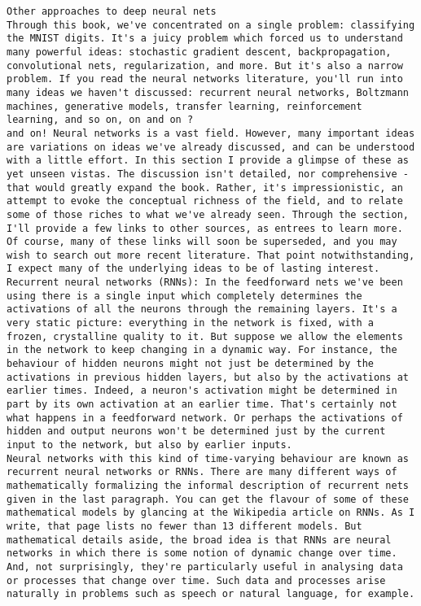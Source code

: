 \begin{lstlisting}
Other approaches to deep neural nets
Through this book, we've concentrated on a single problem: classifying the MNIST digits. It's a juicy problem which forced us to understand many powerful ideas: stochastic gradient descent, backpropagation, convolutional nets, regularization, and more. But it's also a narrow problem. If you read the neural networks literature, you'll run into many ideas we haven't discussed: recurrent neural networks, Boltzmann machines, generative models, transfer learning, reinforcement learning, and so on, on and on ?
and on! Neural networks is a vast field. However, many important ideas are variations on ideas we've already discussed, and can be understood with a little effort. In this section I provide a glimpse of these as yet unseen vistas. The discussion isn't detailed, nor comprehensive - that would greatly expand the book. Rather, it's impressionistic, an attempt to evoke the conceptual richness of the field, and to relate some of those riches to what we've already seen. Through the section, I'll provide a few links to other sources, as entrees to learn more. Of course, many of these links will soon be superseded, and you may wish to search out more recent literature. That point notwithstanding, I expect many of the underlying ideas to be of lasting interest.
Recurrent neural networks (RNNs): In the feedforward nets we've been using there is a single input which completely determines the activations of all the neurons through the remaining layers. It's a very static picture: everything in the network is fixed, with a frozen, crystalline quality to it. But suppose we allow the elements in the network to keep changing in a dynamic way. For instance, the behaviour of hidden neurons might not just be determined by the activations in previous hidden layers, but also by the activations at earlier times. Indeed, a neuron's activation might be determined in part by its own activation at an earlier time. That's certainly not what happens in a feedforward network. Or perhaps the activations of hidden and output neurons won't be determined just by the current input to the network, but also by earlier inputs.
Neural networks with this kind of time-varying behaviour are known as recurrent neural networks or RNNs. There are many different ways of mathematically formalizing the informal description of recurrent nets given in the last paragraph. You can get the flavour of some of these mathematical models by glancing at the Wikipedia article on RNNs. As I write, that page lists no fewer than 13 different models. But mathematical details aside, the broad idea is that RNNs are neural networks in which there is some notion of dynamic change over time. And, not surprisingly, they're particularly useful in analysing data or processes that change over time. Such data and processes arise naturally in problems such as speech or natural language, for example.

\end{lstlisting}

